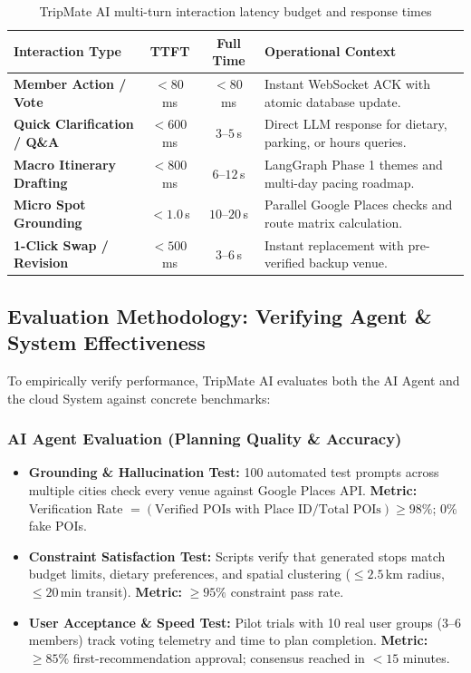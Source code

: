 \documentclass[11pt,a4paper]{article}
\begin{document}
\begin{table}[H]
\centering
\footnotesize
\renewcommand{\arraystretch}{1.06}
\begin{tabularx}{\textwidth}{@{}l c c >{\raggedright\arraybackslash}X@{}}
\toprule
\textbf{Interaction Type} & \textbf{TTFT} & \textbf{Full Time} & \textbf{Operational Context} \\
\midrule
\textbf{Member Action / Vote} & $< 80$\,ms & $< 80$\,ms & Instant WebSocket ACK with atomic database update. \\
\textbf{Quick Clarification / Q\&A} & $< 600$\,ms & $3$--$5$\,s & Direct LLM response for dietary, parking, or hours queries. \\
\textbf{Macro Itinerary Drafting} & $< 800$\,ms & $6$--$12$\,s & LangGraph Phase 1 themes and multi-day pacing roadmap. \\
\textbf{Micro Spot Grounding} & $< 1.0$\,s & $10$--$20$\,s & Parallel Google Places checks and route matrix calculation. \\
\textbf{1-Click Swap / Revision} & $< 500$\,ms & $3$--$6$\,s & Instant replacement with pre-verified backup venue. \\
\bottomrule
\end{tabularx}
\vspace{-0.2cm}
\caption{TripMate AI multi-turn interaction latency budget and response times}
\label{tab:latency_budget}
\end{table}

\subsection{Evaluation Methodology: Verifying Agent \& System Effectiveness}
\label{sec:evaluation}

To empirically verify performance, TripMate AI evaluates both the AI Agent and the cloud System against concrete benchmarks:

\subsubsection{AI Agent Evaluation (Planning Quality \& Accuracy)}
\begin{itemize}[leftmargin=1.2em]
\item \textbf{Grounding \& Hallucination Test:} 100 automated test prompts across multiple cities check every venue against Google Places API.
\textbf{Metric:} Verification Rate $= (\text{Verified POIs with Place ID} / \text{Total POIs}) \ge 98\%$; $0\%$ fake POIs.
\item \textbf{Constraint Satisfaction Test:} Scripts verify that generated stops match budget limits, dietary preferences, and spatial clustering ($\le 2.5$\,km radius, $\le 20$\,min transit).
\textbf{Metric:} $\ge 95\%$ constraint pass rate.
\item \textbf{User Acceptance \& Speed Test:} Pilot trials with 10 real user groups (3--6 members) track voting telemetry and time to plan completion.
\textbf{Metric:} $\ge 85\%$ first-recommendation approval; consensus reached in $< 15$ minutes.
\end{itemize}
\end{document}
